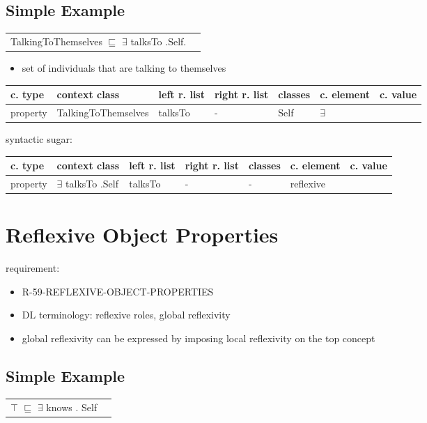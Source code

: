 \documentclass{llncs}
\newenvironment{gcotable}{
  \scriptsize
  \sffamily
  \vspace{0.3cm}
	\begin{center}
  \begin{tabular}{l|l|l|l|l|l|l}
  \hline
  \textbf{c. type} & \textbf{context class} & \textbf{left r. list} & \textbf{right r. list} & \textbf{classes} & \textbf{c. element} & \textbf{c. value} \\
  \hline

}{
  \hline
  \end{tabular}
	\end{center}
}
\newenvironment{DL}{
	\begin{center}
  \begin{tabular}{r l}

}{
  \end{tabular}
	\end{center}
}
\begin{document}
\subsection{Simple Example}

\begin{DL}
TalkingToThemselves $\sqsubseteq$ $\exists$ talksTo .Self. 
\end{DL}

\begin{itemize}
	\item set of individuals that are talking to themselves
\end{itemize}

\begin{gcotable}
property & TalkingToThemselves & talksTo & - & Self & $\exists$ \\
\end{gcotable}

syntactic sugar:

\begin{gcotable}
property & $\exists$ talksTo .Self & talksTo & - & - & reflexive \\
\end{gcotable}


\section{Reflexive Object Properties}

requirement:

\begin{itemize}
	\item R-59-REFLEXIVE-OBJECT-PROPERTIES
\end{itemize}



\begin{itemize}
  \item DL terminology: reflexive roles, global reflexivity
	\item global reflexivity can be expressed by imposing local reflexivity on the top concept \cite{Kroetzsch2012}
\end{itemize}

\subsection{Simple Example}

\begin{DL}
$\top$ $\sqsubseteq$ $\exists$ knows . Self
\end{DL}
\end{document}
